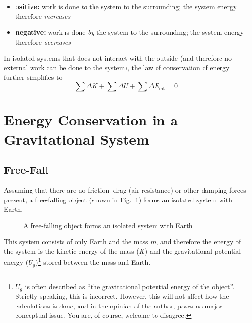 \begin{itemize}[leftmargin=12pt,nosep]
\item\textbf{ositive:} work is done \emph{to} the system to the surrounding;
  the system energy therefore \emph{increases}
\item\textbf{negative:} work is done \emph{by} the system to the surrounding;
  the system energy therefore \emph{decreases}
\end{itemize}
In isolated systems that does not interact with the outside (and therefore
no external work can be done to the system), the law of conservation of energy
further simplifies to
\begin{equation}
  \boxed{
    \sum\Delta K+\sum\Delta U+\sum\Delta E_\text{int}=0
  }
\end{equation}

%  
%

\section{Energy Conservation in a Gravitational System}


\subsection{Free-Fall}
Assuming that there are no friction, drag (air resistance)%
or other damping forces present, a free-falling object (shown in
Fig.~\ref{fig:earth}) forms an isolated system with Earth. 
\begin{figure}[ht]
  \centering
  \caption{A free-falling object forms an isolated system with Earth}
  \label{fig:earth}
\end{figure}
This system consists of only Earth and the mass $m$, and therefore the energy
of the system is the kinetic energy of the mass ($K$) and the gravitational
potential energy ($U_g$)\footnote{$U_g$ is often described as ``the
gravitational potential energy of the object''. Strictly speaking, this is
incorrect.
However, this will not affect how the calculations is done, and in the
opinion of the author, poses no major conceptual issue. You are, of course,
welcome to disagree.
} stored between the mass and Earth.


